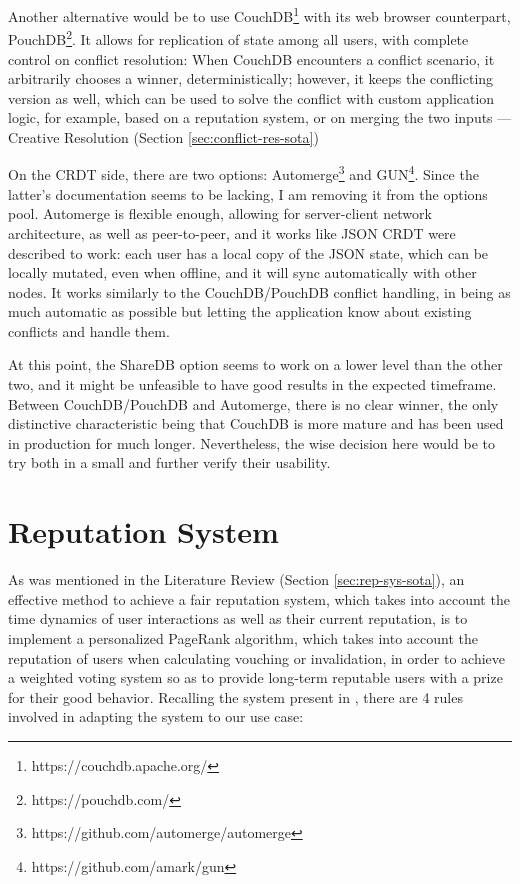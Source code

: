 Another alternative would be to use CouchDB\footnote{https://couchdb.apache.org/} with its web browser counterpart, PouchDB\footnote{https://pouchdb.com/}. It allows for replication of state among all users, with complete control on conflict resolution: When CouchDB encounters a conflict scenario, it arbitrarily chooses a winner, deterministically; however, it keeps the conflicting version as well, which can be used to solve the conflict with custom application logic, for example, based on a reputation system, or on merging the two inputs --- Creative Resolution (Section \ref{sec:conflict-res-sota})

On the CRDT side, there are two options: Automerge\footnote{https://github.com/automerge/automerge} and GUN\footnote{https://github.com/amark/gun}. Since the latter's documentation seems to be lacking, I am removing it from the options pool. Automerge is flexible enough, allowing for server-client network architecture, as well as peer-to-peer, and it works like JSON CRDT were described to work: each user has a local copy of the JSON state, which can be locally mutated, even when offline, and it will sync automatically with other nodes. It works similarly to the CouchDB/PouchDB conflict handling, in being as much automatic as possible but letting the application know about existing conflicts and handle them.

At this point, the ShareDB option seems to work on a lower level than the other two, and it might be unfeasible to have good results in the expected timeframe. Between CouchDB/PouchDB and Automerge, there is no clear winner, the only distinctive characteristic being that CouchDB is more mature and has been used in production for much longer. Nevertheless, the wise decision here would be to try both in a small  and further verify their usability. 

\section{Reputation System} \label{sec:problem-solution-rep-sys}
As was mentioned in the Literature Review (Section \ref{sec:rep-sys-sota}), an effective method to achieve a fair reputation system, which takes into account the time dynamics of user interactions as well as their current reputation, is to implement a personalized PageRank algorithm, which takes into account the reputation of users when calculating vouching or invalidation, in order to achieve a weighted voting system so as to provide long-term reputable users with a prize for their good behavior. Recalling the system present in \cite{Daly2009}, there are 4 rules involved in adapting the system to our use case:

